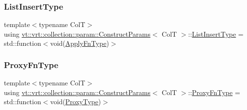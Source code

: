 \subsubsection{\texorpdfstring{List\+Insert\+Type}{ListInsertType}}
{\footnotesize\ttfamily template$<$typename ColT$>$ \\
using \hyperlink{structvt_1_1vrt_1_1collection_1_1param_1_1_construct_params}{vt\+::vrt\+::collection\+::param\+::\+Construct\+Params}$<$ ColT $>$\+::\hyperlink{structvt_1_1vrt_1_1collection_1_1param_1_1_construct_params_aabef3a4ec2a70d29d2b5161daf66e153}{List\+Insert\+Type} =  std\+::function$<$void(\hyperlink{structvt_1_1vrt_1_1collection_1_1param_1_1_construct_params_a4275ecc44239ac1aeedea9d31e93c78f}{Apply\+Fn\+Type})$>$}

\mbox{\label{structvt_1_1vrt_1_1collection_1_1param_1_1_construct_params_ae1b51eac652fafee85f4c370e2c3b585}} 
\subsubsection{\texorpdfstring{Proxy\+Fn\+Type}{ProxyFnType}}
{\footnotesize\ttfamily template$<$typename ColT$>$ \\
using \hyperlink{structvt_1_1vrt_1_1collection_1_1param_1_1_construct_params}{vt\+::vrt\+::collection\+::param\+::\+Construct\+Params}$<$ ColT $>$\+::\hyperlink{structvt_1_1vrt_1_1collection_1_1param_1_1_construct_params_ae1b51eac652fafee85f4c370e2c3b585}{Proxy\+Fn\+Type} =  std\+::function$<$void(\hyperlink{structvt_1_1vrt_1_1collection_1_1param_1_1_construct_params_a837fb2b2a036f898fb65da72d3ee2fb0}{Proxy\+Type})$>$}

\mbox{\label{structvt_1_1vrt_1_1collection_1_1param_1_1_construct_params_a837fb2b2a036f898fb65da72d3ee2fb0}} 
